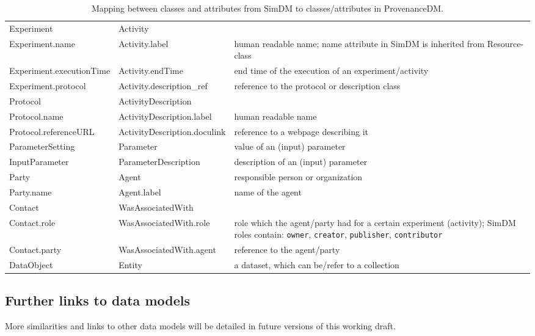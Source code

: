 \begin{table}[h]
\small
{}\textwidth
\begin{tabulary}{1.0\textwidth}{@{}lLp{4cm}@{}}
\toprule
{} &  & \\
\midrule
Experiment      & Activity               & \\
Experiment.name & Activity.label         & human readable name; name attribute in SimDM is inherited from Resource-class\\
Experiment.executionTime  & Activity.endTime & end time of the execution of an experiment/activity \\
Experiment.protocol & Activity.description\_ref & reference to the protocol or description class \\
Protocol        & ActivityDescription    & \\
Protocol.name   & ActivityDescription.label  & human readable name\\
Protocol.referenceURL & ActivityDescription.doculink & reference to a webpage describing it\\
ParameterSetting     & Parameter              & value of an (input) parameter\\
InputParameter       & ParameterDescription              & description of an (input) parameter\\
Party           & Agent                 & responsible person or organization\\
Party.name      & Agent.label & name of the agent \\
Contact         & WasAssociatedWith & \\
Contact.role    & WasAssociatedWith.role & role which the agent/party had for a certain experiment (activity); SimDM roles contain: \texttt{owner}, \texttt{creator}, \texttt{publisher}, \texttt{contributor}\\
Contact.party    & WasAssociatedWith.agent & reference to the agent/party \\
DataObject     & Entity        & a dataset, which can be/refer to a collection\\

\bottomrule
\end{tabulary}
\caption{Mapping between classes and attributes from SimDM to classes/attributes in ProvenanceDM.}
\label{tab:simdmmapping}
\end{table}




\subsection{Further links to data models}
More similarities and links to other data models will be detailed in future 
versions of this working draft.
